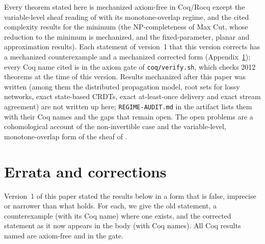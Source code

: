\documentclass[11pt,a4paper]{article}
\theoremstyle{plain}
\theoremstyle{definition}
\theoremstyle{remark}
\renewcommand{\_}{\origunderscore\allowbreak}
\begin{document}
Every theorem stated here is mechanized axiom-free in Coq/Rocq except the variable-level sheaf
reading of  with its monotone-overlap regime, and the cited complexity results for the
minimum (the NP-completeness of Max Cut, whose reduction to the minimum is mechanized, and the
fixed-parameter, planar and approximation results). Each statement of version~1 that this version
corrects has a mechanized counterexample and a mechanized corrected form
(Appendix~\ref{app:errata}); every Coq name cited is in the axiom gate of \texttt{coq/verify.sh},
which checks 2012 theorems at the time of this version. Results mechanized after this paper was
written (among them the distributed propagation model, root sets for lossy networks, exact
state-based CRDTs, exact at-least-once delivery and exact stream agreement) are not written up here;
\texttt{REGIME-AUDIT.md} in the artifact lists them with their Coq names and the gaps that remain
open. The open problems are a cohomological account of the non-invertible case and the
variable-level, monotone-overlap form of the sheaf of .

\appendix
\section{Errata and corrections}
\label{app:errata}

Version~1 of this paper stated the results below in a form that is false, imprecise or narrower than
what holds. For each, we give the old statement, a counterexample (with its Coq name) where one exists,
and the corrected statement as it now appears in the body (with Coq names). All Coq results named are
axiom-free and in the gate.
\end{document}
